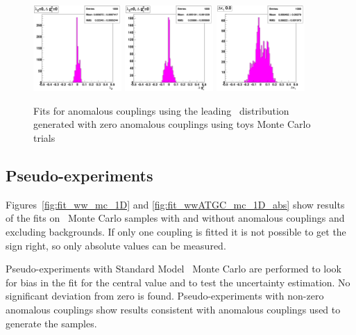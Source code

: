 \begin{figure}[tp]
  \centering
    \includegraphics[width=0.3\textwidth]{figures/fulltoy_lz.pdf}
    \includegraphics[width=0.3\textwidth]{figures/fulltoy_gz1.pdf}
    \includegraphics[width=0.3\textwidth]{figures/fulltoy_kg.pdf}

  \caption[Expected uncertainties]{Fits for anomalous couplings using
  the leading \pt\ distribution generated with zero anomalous
  couplings using toys Monte Carlo trials}

\label{fig:fulltoys}
\end{figure}


\subsection{Pseudo-experiments}
Figures~\ref{fig:fit_ww_mc_1D} and \ref{fig:fit_wwATGC_mc_1D_abs} show
results of the fits on \ww\ Monte Carlo samples with and without
anomalous couplings and excluding backgrounds. If only one coupling is
fitted it is not possible to get the sign right, so only absolute
values can be measured.

Pseudo-experiments with Standard Model \ww\ Monte Carlo are performed
to look for bias in the fit for the central value and to test the
uncertainty estimation. No significant deviation from zero is
found. Pseudo-experiments with non-zero anomalous couplings show
results consistent with anomalous couplings used to generate the
samples.

